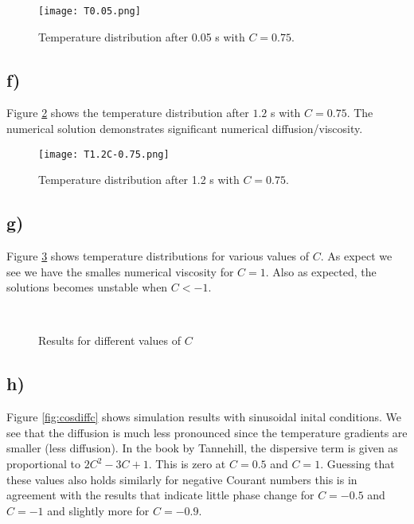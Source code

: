 \documentclass{article}
\begin{document}
\begin{figure}
	\texttt{[image: T0.05.png]}
	
	\caption{Temperature distribution after 0.05 s with $C =0.75$.}
	\label{fig:test}
\end{figure}

\subsection{f)}

Figure \ref{fig:TC075} shows the temperature distribution after $1.2$ s with $C = 0.75$. The numerical solution demonstrates significant numerical diffusion/viscosity.

\begin{figure}
	\texttt{[image: T1.2C-0.75.png]}	
	\caption{Temperature distribution after 1.2 s with $C =0.75$.}
	\label{fig:TC075}
\end{figure}

\subsection{g)}
Figure \ref{fig:diffc} shows temperature distributions for various values of $C$. As expect we see we have the smalles numerical viscosity for $C = 1$. Also as expected, the solutions becomes unstable when $C<-1$.

\begin{figure}
	 \\
	\caption{Results for different values of $C$}
	\label{fig:diffc}
\end{figure}

\subsection{h)}

Figure \ref{fig:cosdiffc} shows simulation results with sinusoidal inital conditions. We see that the diffusion is much less pronounced since the temperature gradients are smaller (less diffusion). In the book by Tannehill, the dispersive term is given as proportional to $2C^2-3C+1$. This is zero at $C = 0.5$ and $C=1$. Guessing that these values also holds similarly for negative Courant numbers this is in agreement with the results that indicate little phase change for $C=-0.5$ and $C=-1$ and slightly more for $C=-0.9$.
\end{document}
